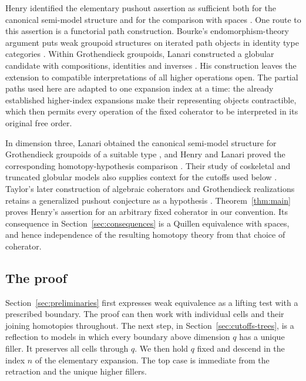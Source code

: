 \documentclass[11pt,letterpaper]{article}
\numberwithin{equation}{section}
\theoremstyle{plain}
\theoremstyle{definition}
\theoremstyle{remark}
\begin{document}
Henry identified the elementary pushout assertion as sufficient both
for the canonical semi-model structure and for the comparison with
spaces \cite[Theorem~5.3.5 and Corollary~5.3.13]{Henry2016}.
One route to this assertion is a functorial path construction.
Bourke's endomorphism-theory argument puts weak groupoid structures
on iterated path objects in identity type categories
\cite[Theorem~5.1]{Bourke2016}.
Within Grothendieck groupoids, Lanari constructed a globular candidate
with compositions, identities and inverses
\cite[Definitions~5.2 and~6.1, Proposition~6.2, and Theorem~6.5]{Lanari2020}.
His construction leaves the extension to compatible interpretations
of all higher operations open.  The partial paths used here are
adapted to one expansion index at a time: the already established
higher-index expansions make their representing objects contractible,
which then permits every operation of the fixed coherator to be
interpreted in its original free order.

In dimension three, Lanari obtained the canonical semi-model structure
for Grothendieck groupoids of a suitable type
\cite[Theorem~4.10]{Lanari2018}, and Henry and Lanari proved the
corresponding homotopy-hypothesis comparison \cite{HenryLanari2023}.
Their study of coskeletal and truncated globular models also supplies
context for the cutoffs used below \cite[Section~2]{HenryLanari2023}.
Taylor's later construction of algebraic coherators and Grothendieck
realizations retains a generalized pushout conjecture as a hypothesis
\cite[Conjecture~5.7 and Theorem~5.8]{Taylor2026}.
Theorem~\ref{thm:main} proves Henry's assertion for an arbitrary fixed
coherator in our convention.  Its consequence in
Section~\ref{sec:consequences} is a Quillen equivalence with spaces,
and hence independence of the resulting homotopy theory from that
choice of coherator.

\subsection*{The proof}

Section~\ref{sec:preliminaries} first expresses weak equivalence as a
lifting test with a prescribed boundary.  The proof can then work with
individual cells and their joining homotopies throughout.
The next step, in Section~\ref{sec:cutoffs-trees}, is a reflection to models in which every boundary above
dimension \(q\) has a unique filler.  It preserves all cells through \(q\).
We then hold \(q\) fixed and descend in the index \(n\) of the elementary
expansion.  The top case is immediate from the retraction and the unique
higher fillers.
\end{document}
